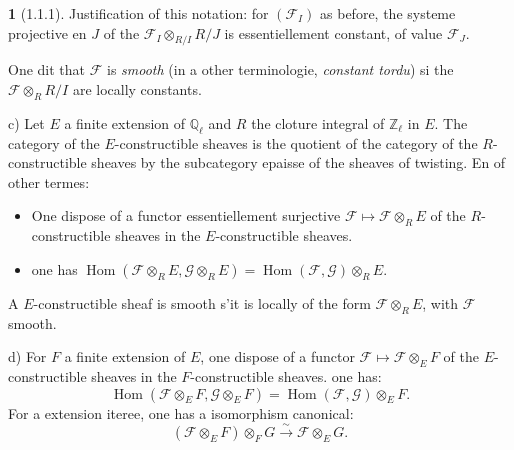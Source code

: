 \documentclass[12pt,a4paper]{article}
\theoremstyle{plain}
\theoremstyle{definition}
\theoremstyle{definition}
\newtheorem{para}{}[section]
\theoremstyle{remark}
\DeclareMathOperator{\Hom}{Hom}
\begin{document}
\begin{para}[1.1.1]
Justification of this notation: for $(\mathscr{F}_I)$ as before, the systeme projective en $J$ of the $\mathscr{F}_I \otimes_{R/I} R/J$ is essentiellement constant, of value $\mathscr{F}_J$.

One dit that $\mathscr{F}$ is \emph{smooth} (in a other terminologie, \emph{constant tordu}) si the $\mathscr{F} \otimes_R R/I$ are locally constants.

c) Let $E$ a finite extension of $\mathbb{Q}_\ell$ and $R$ the cloture integral of $\mathbb{Z}_\ell$ in $E$. The category of the $E$-constructible sheaves is the quotient of the category of the $R$-constructible sheaves by the subcategory epaisse of the sheaves of twisting. En of other termes:
\begin{itemize}[nosep]
\item[$\alpha$)] One dispose of a functor essentiellement surjective $\mathscr{F} \mapsto \mathscr{F} \otimes_R E$ of the $R$-constructible sheaves in the $E$-constructible sheaves.
\item[$\beta$)] one has $\Hom(\mathscr{F} \otimes_R E, \mathscr{G} \otimes_R E) = \Hom(\mathscr{F}, \mathscr{G}) \otimes_R E$.
\end{itemize}

A $E$-constructible sheaf is smooth s'it is locally of the form $\mathscr{F} \otimes_R E$, with $\mathscr{F}$ smooth.

d) For $F$ a finite extension of $E$, one dispose of a functor $\mathscr{F} \mapsto \mathscr{F} \otimes_E F$ of the $E$-constructible sheaves in the $F$-constructible sheaves. one has:
\[\Hom(\mathscr{F} \otimes_E F, \mathscr{G} \otimes_E F) = \Hom(\mathscr{F}, \mathscr{G}) \otimes_E F.\]
For a extension iteree, one has a isomorphism canonical:
\begin{equation}\tag{1}
(\mathscr{F} \otimes_E F) \otimes_F G \xrightarrow{\sim} \mathscr{F} \otimes_E G.
\end{equation}


\end{para}
\end{document}
